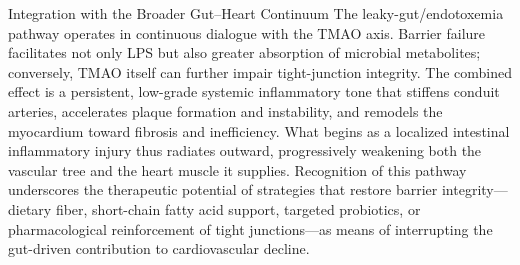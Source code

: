 Integration with the Broader Gut–Heart Continuum
The leaky-gut/endotoxemia pathway operates in continuous dialogue with the TMAO axis. Barrier failure facilitates not only LPS but also greater absorption of microbial metabolites; conversely, TMAO itself can further impair tight-junction integrity. The combined effect is a persistent, low-grade systemic inflammatory tone that stiffens conduit arteries, accelerates plaque formation and instability, and remodels the myocardium toward fibrosis and inefficiency. What begins as a localized intestinal inflammatory injury thus radiates outward, progressively weakening both the vascular tree and the heart muscle it supplies. Recognition of this pathway underscores the therapeutic potential of strategies that restore barrier integrity—dietary fiber, short-chain fatty acid support, targeted probiotics, or pharmacological reinforcement of tight junctions—as means of interrupting the gut-driven contribution to cardiovascular decline.
